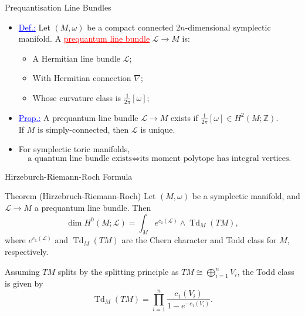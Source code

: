 \documentclass[aspectratio=169,xcolor=dvipsnames]{beamer}
\newcommand{\ra}{\rightarrow}
\newcommand{\ZZ}{\mathbb{Z}}
\newcommand{\Td}{\operatorname{Td}}
\newcommand{\mcL}{\mathcal{L}}
\newcommand{\w}{\omega}
\begin{document}
\begin{frame}{Prequantisation Line Bundles}
	\begin{itemize}
		\item \textcolor{blue}{\underline{Def.:}} Let $(M, \w)$ be a compact connected $2n$-dimensional symplectic manifold. A \textcolor{red}{\underline{prequantum line bundle}} $\mcL \ra M$ is:
		\begin{itemize}
			\item A Hermitian line bundle $\mcL$;
			\item With Hermitian connection $\nabla$;
			\item Whose curvature class is $\tfrac{1}{2\pi}[\w]$;
		\end{itemize}
		\item \textcolor{blue}{\underline{Prop.:}} A prequantum line bundle $\mcL \ra M$ exists if $\tfrac{1}{2\pi}[\w] \in H^{2}(M; \ZZ)$. \\ If $M$ is simply-connected, then $\mcL$ is unique.
		\hfill \break
		\item For symplectic toric manifolds,
		\[
			\text{a quantum line bundle exists} \iff \text{its moment polytope has integral vertices.}
		\]
	\end{itemize}
\end{frame}

\begin{frame}{Hirzeburch-Riemann-Roch Formula}
	\begin{block}{Theorem (Hirzebruch-Riemann-Roch)}
		Let $(M, \w)$ be a symplectic manifold, and $\mcL \ra M$ a prequantum line bundle. Then
		\[
			\dim H^{0}(M; \mcL) = \int_{M} e^{c_{1}(\mcL)} \wedge \Td_{M}(TM),
		\]
		where $e^{c_{1}(\mcL)}$ and $\Td_{M}(TM)$ are the Chern character and Todd class for $M$, respectively.
	\end{block}
	Assuming $TM$ splits by the splitting principle as $TM \cong \bigoplus_{i=1}^{n} V_{i}$, the Todd class is given by
	\[
		\Td_{M}(TM) = \prod_{i=1}^{n} \frac{c_{1}(V_{i})}{1 - e^{-c_{1}(V_{i})}}.
	\]
\end{frame}
\end{document}
